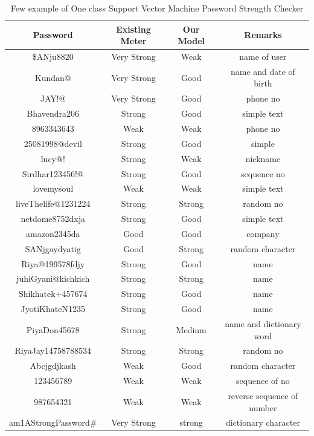 \documentclass[runningheads]{llncs}
\begin{document}
{\begin{table}[htb]
\caption{Few example of One class Support Vector Machine Password Strength Checker}
\begin{tabular}{||c||c||c||c||}
    \hline
    \hline
    \textbf{Password} & \textbf{Existing Meter} & \textbf{Our Model}&\textbf{Remarks} \\
    \hline
    
     \$ANju8820   & Very Strong & Weak & name of user \\
 \hline
 Kundan@#1994  & Very Strong  & Good & name and date of birth \\
 \hline
 JAY!@#882037820  & Very Strong & Good & phone no \\
 \hline
 Bhavendra206 & Strong & Good & simple text\\
 \hline
 8963343643 & Weak & Weak & phone no\\
 \hline
 25081998@devil & Strong & Good & simple\\
 \hline
 lucy@!#9863 & Strong & Weak  & nickname\\
 \hline
 Sirdhar123456!@ & Strong & Good& sequence no\\
 \hline
 lovemysoul & Weak & Weak& simple text\\
 \hline
 liveThelife@1231224 & Strong& Strong& random no\\
 \hline
 netdome8752dxja &Strong &Good& simple text\\
 \hline
 amazon2345da & Good & Good& company\\ 
 \hline
 SANjgaydyatig & Good & Strong& random character\\
 \hline
 Riya@199578fdjy & Strong & Good& name\\
 \hline
 juhiGyani@kichkich & Strong& Strong& name\\
 \hline
 Shikhatek+457674 &Strong & Good& name\\
 \hline
 JyotiKhateN1235 & Strong & Good& name\\
 \hline
 PiyaDon45678 & Strong & Medium& name and dictionary word\\
 \hline
 RiyaJay14758788534 & Strong & Strong& random no\\
\hline
Abcjgdjkash & Weak & Good& random character\\
\hline
123456789 & Weak & Weak& sequence of no\\
\hline
987654321 & Weak & Weak&reverse sequence of number\\
\hline
am1AStrongPassword# & Very Strong & strong& dictionary character\\ 

\end{tabular}
\end{table}}
\end{document}
